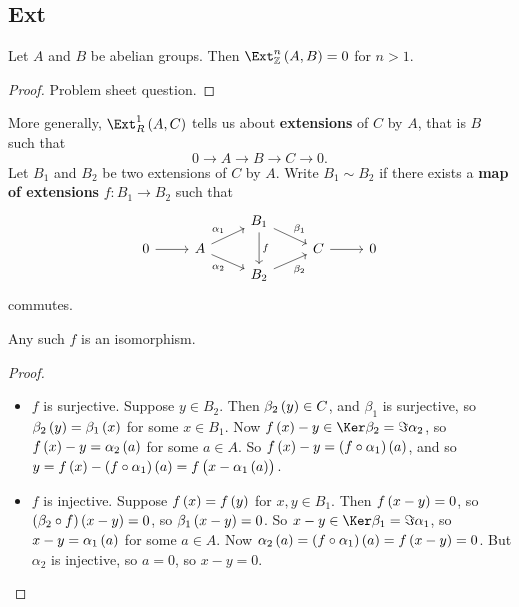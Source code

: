 \subsection{Ext}

\begin{proposition}
Let $ A $ and $ B $ be abelian groups. Then $ \Ext_\ZZ^n\br{A, B} = 0 $ for $ n > 1 $.
\end{proposition}

\begin{proof}
Problem sheet question.
\end{proof}

More generally, $ \Ext_R^1\br{A, C} $ tells us about \textbf{extensions} of $ C $ by $ A $, that is $ B $ such that
$$ 0 \to A \to B \to C \to 0. $$
Let $ B_1 $ and $ B_2 $ be two extensions of $ C $ by $ A $. Write $ B_1 \sim B_2 $ if there exists a \textbf{map of extensions} $ f : B_1 \to B_2 $ such that
$$
\begin{tikzcd}[row sep=tiny]
& & B_1 \arrow{dr}{\beta_1} \arrow{dd}{f} & & \\
0 \arrow{r} & A \arrow{ur}{\alpha_1} \arrow[swap]{dr}{\alpha_2} & & C \arrow{r} & 0 \\
& & B_2 \arrow[swap]{ur}{\beta_2} & &
\end{tikzcd}
$$
commutes.

\begin{proposition}
Any such $ f $ is an isomorphism.
\end{proposition}

\begin{proof}
\hfill
\begin{itemize}
\item $ f $ is surjective. Suppose $ y \in B_2 $. Then $ \beta_2\br{y} \in C $, and $ \beta_1 $ is surjective, so $ \beta_2\br{y} = \beta_1\br{x} $ for some $ x \in B_1 $. Now $ f\br{x} - y \in \Ker \beta_2 = \Im \alpha_2 $, so $ f\br{x} - y = \alpha_2\br{a} $ for some $ a \in A $. So $ f\br{x} - y = \br{f \circ \alpha_1}\br{a} $, and so $ y = f\br{x} - \br{f \circ \alpha_1}\br{a} = f\br{x - \alpha_1\br{a}} $.
\item $ f $ is injective. Suppose $ f\br{x} = f\br{y} $ for $ x, y \in B_1 $. Then $ f\br{x - y} = 0 $, so $ \br{\beta_2 \circ f}\br{x - y} = 0 $, so $ \beta_1\br{x - y} = 0 $. So $ x - y \in \Ker \beta_1 = \Im \alpha_1 $, so $ x - y = \alpha_1\br{a} $ for some $ a \in A $. Now $ \alpha_2\br{a} = \br{f \circ \alpha_1}\br{a} = f\br{x - y} = 0 $. But $ \alpha_2 $ is injective, so $ a = 0 $, so $ x - y = 0 $.
\end{itemize}
\end{proof}

